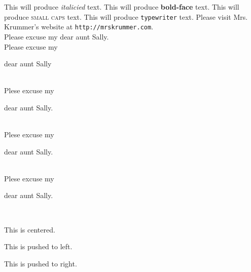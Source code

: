 \documentclass[11pt]{article}
\begin{document}
This will produce \textit{italicied} text.
This will produce \textbf{bold-face} text.
This will produce \textsc{small caps} text.
This will produce \texttt{typewriter} text.
Please visit Mrs. Krummer's website at \texttt{http://mrskrummer.com}.\\
Please excuse my dear aunt Sally. \\
Please excuse my \begin{large} dear aunt Sally \end{large}\\
Plese excuse my \begin{huge} dear aunt Sally. \end{huge}\\
Plese excuse my \begin{small} dear aunt Sally. \end{small}\\
Plese excuse my \begin{tiny} dear aunt Sally. \end{tiny}\\
\begin{center}This is centered. \end{center}
\begin{flushleft}This is pushed to left.\end{flushleft} 
\begin{flushright}This is pushed to right. \end{flushright}
\end{document}
